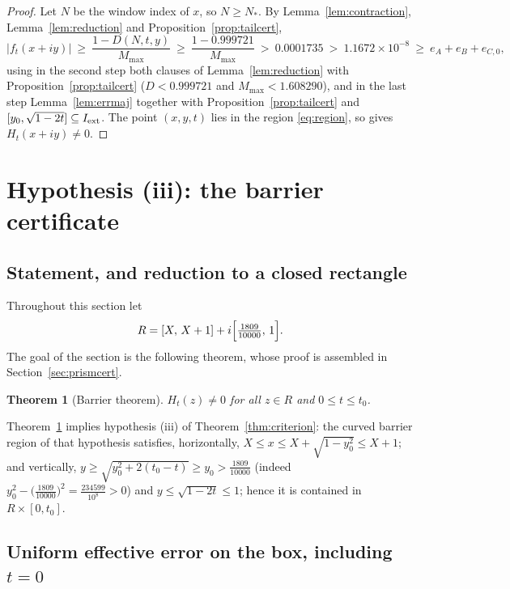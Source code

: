 \documentclass[11pt]{article}
\newtheorem{theorem}{Theorem}[section]
\theoremstyle{definition}
\begin{document}
\begin{proof}
Let $N$ be the window index of $x$, so $N\ge N_*$. By
Lemma~\ref{lem:contraction}, Lemma~\ref{lem:reduction} and
Proposition~\ref{prop:tailcert},
\[
|f_t(x+iy)|\ \ge\ \frac{1-D(N,t,y)}{M_{\max}}
\ \ge\ \frac{1-0.999721}{M_{\max}}
\ >\ 0.0001735
\ >\ 1.1672\times10^{-8}
\ \ge\ e_A+e_B+e_{C,0},
\]
using in the second step both clauses of
Lemma~\ref{lem:reduction} with Proposition~\ref{prop:tailcert}
($D<0.999721$ and $M_{\max}<1.608290$), and in the last step
Lemma~\ref{lem:errmaj} together with
Proposition~\ref{prop:tailcert} and
$[y_0,\sqrt{1-2t}]\subseteq I_{\rm ext}$. The point $(x,y,t)$
lies in the region \eqref{eq:region}, so
\cite[Corollary~1.4]{Polymath} gives $H_t(x+iy)\neq0$.
\end{proof}

\section{Hypothesis (iii): the barrier certificate}\label{sec:barrier}

\subsection{Statement, and reduction to a closed rectangle}

Throughout this section let
\[
R=[X,\,X+1]+i\Bigl[\tfrac{1809}{10000},\,1\Bigr].
\]
The goal of the section is the following theorem, whose proof is
assembled in Section~\ref{sec:prismcert}.

\begin{theorem}[Barrier theorem]\label{thm:barrier}
$H_t(z)\ne0$ for all $z\in R$ and $0\le t\le t_0$.
\end{theorem}

Theorem~\ref{thm:barrier} implies hypothesis (iii) of
Theorem~\ref{thm:criterion}: the curved barrier region of that
hypothesis satisfies, horizontally,
$X\le x\le X+\sqrt{1-y_0^2}\le X+1$; and vertically,
$y\ge\sqrt{y_0^2+2(t_0-t)}\ge y_0>\frac{1809}{10000}$ (indeed
$y_0^2-\bigl(\frac{1809}{10000}\bigr)^2=\frac{234599}{10^8}>0$) and
$y\le\sqrt{1-2t}\le1$; hence it is contained in $R\times[0,t_0]$.

\subsection{Uniform effective error on the box, including $t=0$}
\label{sec:barriererr}
\end{document}
